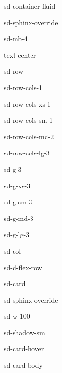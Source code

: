 \documentclass[letterpaper,10pt,english]{jupyterBook}
\begin{document}
\begin{sphinxuseclass}{sd-container-fluid}
\begin{sphinxuseclass}{sd-sphinx-override}
\begin{sphinxuseclass}{sd-mb-4}
\begin{sphinxuseclass}{text-center}
\begin{sphinxuseclass}{sd-row}
\begin{sphinxuseclass}{sd-row-cols-1}
\begin{sphinxuseclass}{sd-row-cols-xs-1}
\begin{sphinxuseclass}{sd-row-cols-sm-1}
\begin{sphinxuseclass}{sd-row-cols-md-2}
\begin{sphinxuseclass}{sd-row-cols-lg-3}
\begin{sphinxuseclass}{sd-g-3}
\begin{sphinxuseclass}{sd-g-xs-3}
\begin{sphinxuseclass}{sd-g-sm-3}
\begin{sphinxuseclass}{sd-g-md-3}
\begin{sphinxuseclass}{sd-g-lg-3}
\begin{sphinxuseclass}{sd-col}
\begin{sphinxuseclass}{sd-d-flex-row}
\begin{sphinxuseclass}{sd-card}
\begin{sphinxuseclass}{sd-sphinx-override}
\begin{sphinxuseclass}{sd-w-100}
\begin{sphinxuseclass}{sd-shadow-sm}
\begin{sphinxuseclass}{sd-card-hover}
\begin{sphinxuseclass}{sd-card-body}
\end{sphinxuseclass}{\hyperref[\detokenize{content/1_Tutorials::doc}]{}}
\end{sphinxuseclass}
\end{sphinxuseclass}
\end{sphinxuseclass}
\end{sphinxuseclass}
\end{sphinxuseclass}
\end{sphinxuseclass}
\end{sphinxuseclass}
\end{sphinxuseclass}
\end{sphinxuseclass}
\end{sphinxuseclass}
\end{sphinxuseclass}
\end{sphinxuseclass}
\end{sphinxuseclass}
\end{sphinxuseclass}
\end{sphinxuseclass}
\end{sphinxuseclass}
\end{sphinxuseclass}
\end{sphinxuseclass}
\end{sphinxuseclass}
\end{sphinxuseclass}
\end{sphinxuseclass}
\end{sphinxuseclass}
\begin{DUlineblock}{0em}
\item[] 
\end{DUlineblock}
\end{document}
